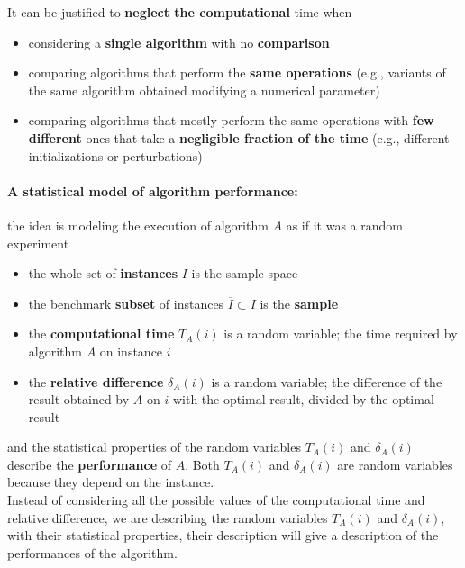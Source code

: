 \documentclass[11pt]{article}
\begin{document}
	It can be justified to \textbf{neglect the computational} time when
	\begin{itemize}
		\item considering a \textbf{single algorithm} with no \textbf{comparison} 
		\item comparing algorithms that perform the \textbf{same operations} (e.g., variants of the same algorithm obtained modifying a numerical parameter)
		\item comparing algorithms that mostly perform the same operations with \textbf{few different} ones that take a \textbf{negligible fraction of the time} (e.g., different initializations or perturbations)
	\end{itemize}
	
	\paragraph{A statistical model of algorithm performance:} the idea is modeling the execution of algorithm $A$ as if it was a random experiment
	\begin{itemize}
		\item the whole set of \textbf{instances} $I$ is the sample space
		\item the benchmark \textbf{subset} of instances $\overline{I} \subset I$ is the \textbf{sample}
		\item the \textbf{computational time} $T_A (i)$ is a random variable; the time required by algorithm $A$ on instance $i$
		\item the \textbf{relative difference} $\delta_A (i )$ is a random variable; the difference of the result obtained by $A$ on $i$ with the optimal result, divided by the optimal result
	\end{itemize}
	and the statistical properties of the random variables $T_A (i )$ and $\delta_A (i )$ describe the \textbf{performance} of $A$. Both $T_A (i)$ and $\delta_A (i)$ are random variables because they depend on the instance. \\
	
	Instead of considering all the possible values of the computational time and relative difference, we are describing the random variables $T_A (i)$ and $\delta_A (i)$, with their statistical properties, their description will give a description of the performances of the algorithm.\\
	
	\newpage
	
\end{document}
